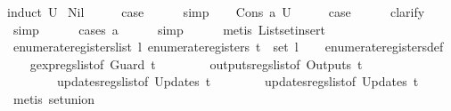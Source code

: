 \begin{isabellebody}
%
\isatagproof
{}\isamarkupfalse%
{\isacharparenleft}induct\ U{\isacharparenright}\isanewline
{}\isamarkupfalse%
\ Nil\isanewline
\ \ \isamarkupfalse%
\ \isamarkupfalse%
\ {\isacharquery}case\isanewline
\ \ \ \ \isamarkupfalse%
\ simp\isanewline
{}\isamarkupfalse%
\isanewline
\ \ \isamarkupfalse%
\ {\isacharparenleft}Cons\ a\ U{\isacharparenright}\isanewline
\ \ \isamarkupfalse%
\ \isamarkupfalse%
\ {\isacharquery}case\isanewline
\ \ \ \ \isamarkupfalse%
\ clarify\isanewline
\ \ \ \ \isamarkupfalse%
\ simp\isanewline
\ \ \ \ \isamarkupfalse%
\ {\isacharparenleft}cases\ a{\isacharparenright}\isanewline
\ \ \ \ \isamarkupfalse%
\ simp\isanewline
\ \ \ \ \isamarkupfalse%
\ {\isacharparenleft}metis\ List{\isachardot}set{\isacharunderscore}insert{\isacharparenright}\isanewline
{}\isamarkupfalse%
%
\endisatagproof
{\isafoldproof}%
%
\isadelimproof
\isanewline
%
\endisadelimproof
\isanewline
{}\isamarkupfalse%
\ enumerate{\isacharunderscore}registers{\isacharunderscore}list{\isacharcolon}\ {\isachardoublequoteopen}{\isasymexists}l{\isachardot}\ enumerate{\isacharunderscore}registers\ t\ {\isacharequal}\ set\ l{\isachardoublequoteclose}\isanewline
%
\isadelimproof
\ \ %
\endisadelimproof
%
\isatagproof
{}\isamarkupfalse%
\ enumerate{\isacharunderscore}registers{\isacharunderscore}def\isanewline
\ \ \isamarkupfalse%
\ gexp{\isacharunderscore}regs{\isacharunderscore}list{\isacharbrackleft}of\ {\isachardoublequoteopen}Guard\ t{\isachardoublequoteclose}{\isacharbrackright}\isanewline
\ \ \ \ \ \ \ \ outputs{\isacharunderscore}regs{\isacharunderscore}list{\isacharbrackleft}of\ {\isachardoublequoteopen}Outputs\ t{\isachardoublequoteclose}{\isacharbrackright}\isanewline
\ \ \ \ \ \ \ \ updates{\isacharunderscore}regs{\isacharunderscore}list{\isacharunderscore}{}{\isacharbrackleft}of\ {\isachardoublequoteopen}Updates\ t{\isachardoublequoteclose}{\isacharbrackright}\isanewline
\ \ \ \ \ \ \ \ updates{\isacharunderscore}regs{\isacharunderscore}list{\isacharunderscore}{}{\isacharbrackleft}of\ {\isachardoublequoteopen}Updates\ t{\isachardoublequoteclose}{\isacharbrackright}\isanewline
\ \ \isamarkupfalse%
\ {\isacharparenleft}metis\ set{\isacharunderscore}union{\isacharparenright}%
\endisatagproof
{\isafoldproof}%
%
\isadelimproof
\isanewline

\end{isabellebody}
